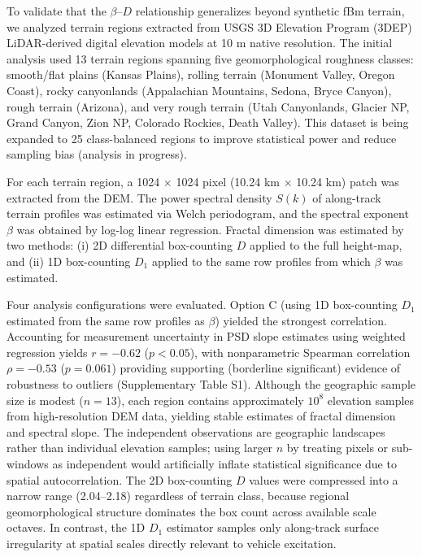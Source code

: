 \documentclass[11pt]{article}
\begin{document}
To validate that the $\beta$--$D$ relationship generalizes beyond synthetic fBm terrain, we analyzed terrain regions extracted from USGS 3D Elevation Program (3DEP) LiDAR-derived digital elevation models at 10 m native resolution. The initial analysis used 13 terrain regions spanning five geomorphological roughness classes: smooth/flat plains (Kansas Plains), rolling terrain (Monument Valley, Oregon Coast), rocky canyonlands (Appalachian Mountains, Sedona, Bryce Canyon), rough terrain (Arizona), and very rough terrain (Utah Canyonlands, Glacier NP, Grand Canyon, Zion NP, Colorado Rockies, Death Valley). This dataset is being expanded to 25 class-balanced regions to improve statistical power and reduce sampling bias (analysis in progress).

For each terrain region, a 1024 $\times$ 1024 pixel (10.24 km $\times$ 10.24 km) patch was extracted from the DEM. The power spectral density $S(k)$ of along-track terrain profiles was estimated via Welch periodogram, and the spectral exponent $\beta$ was obtained by log-log linear regression. Fractal dimension was estimated by two methods: (i) 2D differential box-counting $D$ applied to the full height-map, and (ii) 1D box-counting $D_1$ applied to the same row profiles from which $\beta$ was estimated.

Four analysis configurations were evaluated. Option C (using 1D box-counting $D_1$ estimated from the same row profiles as $\beta$) yielded the strongest correlation. Accounting for measurement uncertainty in PSD slope estimates using weighted regression yields $r = -0.62$ ($p < 0.05$), with nonparametric Spearman correlation $\rho = -0.53$ ($p = 0.061$) providing supporting (borderline significant) evidence of robustness to outliers (Supplementary Table S1). Although the geographic sample size is modest ($n=13$), each region contains approximately $10^8$ elevation samples from high-resolution DEM data, yielding stable estimates of fractal dimension and spectral slope. The independent observations are geographic landscapes rather than individual elevation samples; using larger $n$ by treating pixels or sub-windows as independent would artificially inflate statistical significance due to spatial autocorrelation. The 2D box-counting $D$ values were compressed into a narrow range (2.04--2.18) regardless of terrain class, because regional geomorphological structure dominates the box count across available scale octaves. In contrast, the 1D $D_1$ estimator samples only along-track surface irregularity at spatial scales directly relevant to vehicle excitation.
\end{document}
